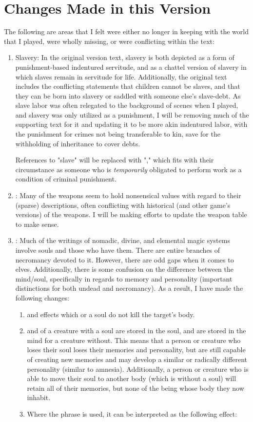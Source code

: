 \chapter{Changes Made in this Version}
\label{ch:changes}
The following are areas that I felt were either no longer in keeping with the world that I played, were wholly missing, or were conflicting within the text:
\begin{enumerate}[leftmargin=12pt]
\item Slavery: In the original version text, slavery is both depicted as a form of punishment-based indentured servitude, and as a chattel version of slavery in which slaves remain in servitude for life. Additionally, the original text includes the conflicting statements that children cannot be slaves, and that they can be born into slavery or saddled with someone else's slave-debt. As slave labor was often relegated to the background of scenes when I played, and slavery was only utilized as a punishment, I will be removing much of the supporting text for it and updating it to be more akin indentured labor, with the punishment for crimes not being transferable to kin, save for the withholding of inheritance to cover debts. 

References to "slave" will be replaced with "," which fits with their circumstance as someone who is \textit{temporarily} obligated to perform work as a condition of criminal punishment. 
\item {}: Many of the weapons seem to hold nonsensical values with regard to their (sparse) descriptions, often conflicting with historical (and other game's versions) of the weapons. I will be making efforts to update the weapon table to make sense.
\item {}: Much of the writings of nomadic, divine, and elemental magic systems involve souls and those who have them. There are entire branches of necromancy devoted to it. However, there are odd gaps when it comes to elves. Additionally, there is some confusion on the difference between the mind/soul, specifically in regards to memory and personality (important distinctions for both undead and necromancy). As a result, I have made the following changes:
\begin{enumerate}
	\item {} and effects which  or  a soul do not kill the target's body.
	\item {} and  of a creature with a soul are stored in the soul, and are stored in the mind for a creature without. This means that a person or creature who loses their soul loses their memories and personality, but are still capable of creating new memories and may develop a similar or radically different personality (similar to amnesia). Additionally, a person or creature who is able to move their soul to another body (which is without a soul) will retain all of their memories, but none of the being whose body they now inhabit.
	\item Where the phrase  is used, it can be interpreted as the following effect:


\end{enumerate}
\end{enumerate}

